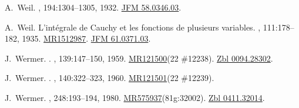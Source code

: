 \documentclass[11pt,a4paper, final, twoside]{article}
\numberwithin{equation}{section}
\begin{document}
\begin{appendices}
\begin{thebibliography}{100}
A.~Weil.
, 194:1304--1305, 1932.
\newblock \href{http://zbmath.org/?q=an:58.0346.03}{JFM 58.0346.03}.

A.~Weil.
\newblock L'int\'egrale de {C}auchy et les fonctions de plusieurs variables.
, 111:178--182, 1935.
\newblock \href{http://www.ams.org/mathscinet-getitem?mr=1512987}{MR1512987}.
  \href{http://zbmath.org/?q=an:61.0371.03}{JFM 61.0371.03}.

J.~Wermer.
.
, 139:147--150, 1959.
\newblock \href{http://www.ams.org/mathscinet-getitem?mr=121500}{MR121500}(22
  \#12238). \href{http://zbmath.org/?q=an:0094.28302}{Zbl 0094.28302}.

J.~Wermer.
.
, 140:322--323, 1960.
\newblock \href{http://www.ams.org/mathscinet-getitem?mr=121501}{MR121501}(22
  \#12239).

J.~Wermer.
, 248:193--194, 1980.
\newblock
  \href{http://www.ams.org/mathscinet-getitem?mr=575937}{MR575937}(81g:32002).
  \href{http://zbmath.org/?q=an:0411.32014}{Zbl 0411.32014}.

\end{thebibliography}

\end{appendices}
\end{document}
